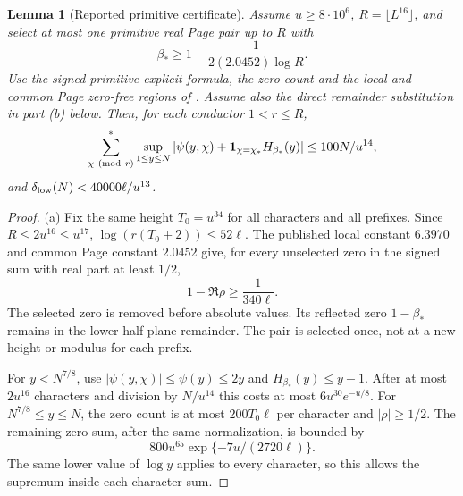 \documentclass[11pt,a4paper]{article}
\newtheorem{lemma}[theorem]{Lemma}
\theoremstyle{definition}
\theoremstyle{remark}
\begin{document}
\begin{lemma}[Reported primitive certificate]\label{lem:ext-primitive}
Assume $u\geq8\cdot10^6$, $R=\lfloor L^{16}\rfloor$, and select
at most one primitive real Page pair up to $R$ with
\[
 \beta_*\geq1-\frac1{2(2.0452)\log R}.
\]
Use the signed primitive explicit formula, the zero count and the
local and common Page zero-free regions of \cite{Bordignon}.
Assume also the direct remainder substitution in part (b) below.
Then, for each conductor $1<r\leq R$,
\[
 \sum_{\chi\ ({\rm mod}\ r)}^*
 \sup_{1\leq y\leq N}
 |\psi(y,\chi)+\mathbf1_{\chi=\chi_*}H_{\beta_*}(y)|
 \leq100N/u^{14},
\]
and $\delta_{\rm low}(N)<40000\ell/u^{13}$.
\end{lemma}

\begin{proof}
(a) Fix the same height $T_0=u^{34}$ for all characters and all
prefixes. Since $R\leq2u^{16}\leq u^{17}$,
$\log(r(T_0+2))\leq52\ell$. The published local constant
$6.3970$ and common Page constant $2.0452$ give, for every unselected
zero in the signed sum with real part at least $1/2$,
\[
 1-\Re\rho\geq\frac1{340\ell}.
\]
The selected zero is removed before absolute values. Its reflected
zero $1-\beta_*$ remains in the lower-half-plane remainder. The pair
is selected once, not at a new height or modulus for each prefix.

For $y<N^{7/8}$, use $|\psi(y,\chi)|\leq\psi(y)\leq2y$ and
$H_{\beta_*}(y)\leq y-1$. After at most $2u^{16}$ characters and
division by $N/u^{14}$ this costs at most
$6u^{30}e^{-u/8}$.
For $N^{7/8}\leq y\leq N$, the zero count is at most
$200T_0\ell$ per character and $|\rho|\geq1/2$. The remaining-zero
sum, after the same normalization, is bounded by
\begin{equation}\label{eq:ext-zero-fee}
 800u^{65}\exp\{-7u/(2720\ell)\}.
\end{equation}
The same lower value of $\log y$ applies to every character, so this
allows the supremum inside each character sum.


\end{proof}
\end{document}
